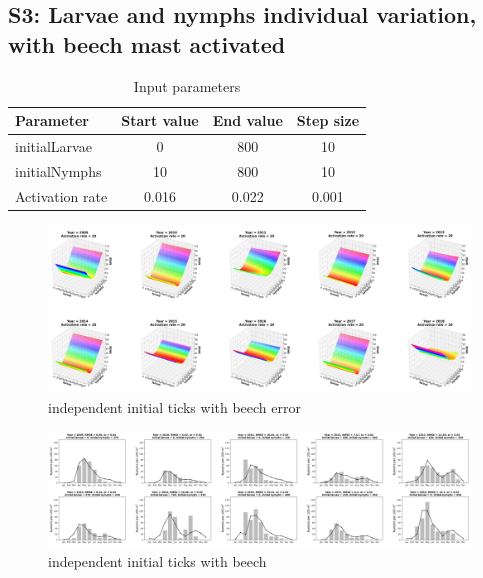 \documentclass[a4paper, 11pt]{scrartcl}
\begin{document}
\newpage
\subsection{S3: Larvae and nymphs individual variation, with beech mast activated}


\begin{table}[h!]
\caption{Input parameters}
\label{tab:independent_initial_ticks_params}
\begin{tabularx}{\textwidth}{lccc}
\toprule
\textbf{Parameter} 	& \textbf{Start value} & \textbf{End value} & \textbf{Step size} \\
\midrule
initialLarvae   	& 0 		& 800  		& 10 \\
initialNymphs   	& 10   		& 800	 	& 10 \\
Activation rate     & 0.016     & 0.022   	& 0.001 \\
\bottomrule
\end{tabularx}
\end{table}


\begin{figure}[h!]
\centering
\includegraphics[width=1.0\textwidth]{figures/independent_initial_ticks_with_beech_error.PNG}
\caption{independent initial ticks with beech error}
\label{fig:independent_initial_ticks_with_beech_error}
\end{figure}

\begin{figure}[h!]
\centering
\includegraphics[width=1.0\textwidth]{figures/independent_initial_ticks_with_beech.PNG}
\caption{independent initial ticks with beech}
\label{fig:independent_initial_ticks_with_beech}
\end{figure}
\end{document}
